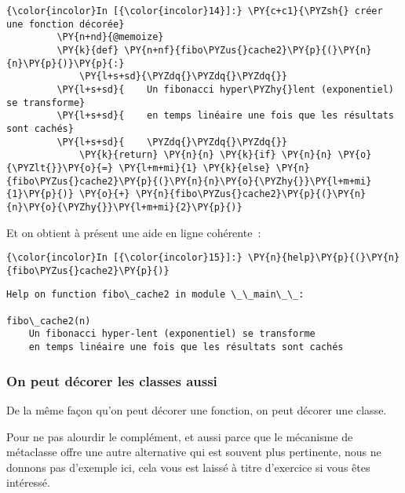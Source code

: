     \begin{Verbatim}[commandchars=\\\{\},frame=single,framerule=0.3mm,rulecolor=\color{cellframecolor}]
{\color{incolor}In [{\color{incolor}14}]:} \PY{c+c1}{\PYZsh{} créer une fonction décorée}
         \PY{n+nd}{@memoize}
         \PY{k}{def} \PY{n+nf}{fibo\PYZus{}cache2}\PY{p}{(}\PY{n}{n}\PY{p}{)}\PY{p}{:}
             \PY{l+s+sd}{\PYZdq{}\PYZdq{}\PYZdq{}}
         \PY{l+s+sd}{    Un fibonacci hyper\PYZhy{}lent (exponentiel) se transforme}
         \PY{l+s+sd}{    en temps linéaire une fois que les résultats sont cachés}
         \PY{l+s+sd}{    \PYZdq{}\PYZdq{}\PYZdq{}}
             \PY{k}{return} \PY{n}{n} \PY{k}{if} \PY{n}{n} \PY{o}{\PYZlt{}}\PY{o}{=} \PY{l+m+mi}{1} \PY{k}{else} \PY{n}{fibo\PYZus{}cache2}\PY{p}{(}\PY{n}{n}\PY{o}{\PYZhy{}}\PY{l+m+mi}{1}\PY{p}{)} \PY{o}{+} \PY{n}{fibo\PYZus{}cache2}\PY{p}{(}\PY{n}{n}\PY{o}{\PYZhy{}}\PY{l+m+mi}{2}\PY{p}{)}
\end{Verbatim}


    Et on obtient à présent une aide en ligne cohérente~:

    \begin{Verbatim}[commandchars=\\\{\},frame=single,framerule=0.3mm,rulecolor=\color{cellframecolor}]
{\color{incolor}In [{\color{incolor}15}]:} \PY{n}{help}\PY{p}{(}\PY{n}{fibo\PYZus{}cache2}\PY{p}{)}
\end{Verbatim}


    \begin{Verbatim}[commandchars=\\\{\},frame=single,framerule=0.3mm,rulecolor=\color{cellframecolor}]
Help on function fibo\_cache2 in module \_\_main\_\_:

fibo\_cache2(n)
    Un fibonacci hyper-lent (exponentiel) se transforme
    en temps linéaire une fois que les résultats sont cachés
\end{Verbatim}

    \hypertarget{on-peut-duxe9corer-les-classes-aussi}{%
\subsubsection{On peut décorer les classes
aussi}\label{on-peut-duxe9corer-les-classes-aussi}}

    De la même façon qu'on peut décorer une fonction, on peut décorer une
classe.

Pour ne pas alourdir le complément, et aussi parce que le mécanisme de
métaclasse offre une autre alternative qui est souvent plus pertinente,
nous ne donnons pas d'exemple ici, cela vous est laissé à titre
d'exercice si vous êtes intéressé.

